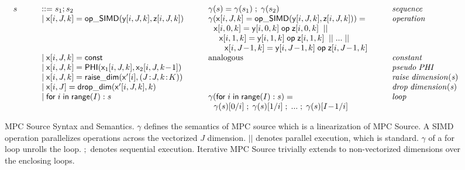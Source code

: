 \begin{figure*}%
\[
\begin{array}{l@{~~~~~}l}
  \begin{array}{l@{~~~~~~~~~}l@{~~~~~~~~~}l@{~~~~~~~~~}l}
  s &::= s_1;s_2 & \gamma(s) = \gamma(s_1) \; ; \; \gamma(s_2) & \mathit{sequence} \\
     & \mid \x[i,J,k] = {\sf op\_SIMD}(\y[i,J,k], \z[i,J,k]) & \gamma(\x[i,J,k] = {\sf op\_SIMD}(\y[i,J,k], \z[i,J,k])) = & \mathit{operation} \\ 
     &                                                                               & ~~\x[i,0,k] = \y[i,0,k] \; {\sf op} \; \z[i,0,k] \;\; || &  \\
     &                                                                               & ~~~~\x[i,1,k] = \y[i,1,k] \; {\sf op} \; \z[i,1,k] \;\; || \; ...\; || & \\
     &                                                                               & ~~~~~~\x[i,J\!-\!1,k] = \y[i,J\!-\!1,k] \; {\sf op} \; \z[i,J\!-\!1,k] & \\
     & \mid \x[i,J,k] = {\sf const} & \mbox{analogous} & \mathit{constant} \\
     & \mid \x[i,J,k]  = {\sf PHI}(\x_1[i,J,k],\x_2[i,J,k\!-\!1]) & & \mathit{pseudo} \; \mathit{PHI} \\
     & \mid \x[i,J,k] = {\sf raise\_dim}(\x'[i],(J\!:\!J,k\!:\!K)) & & \mathit{raise} \; \mathit{dimension(s)} \\
     & \mid \x[i,J] = {\sf drop\_dim}(\x'[i,J,k],k) &  & \mathit{drop} \; \mathit{dimension(s)} \\
     & \mid {\sf for} \; i \; {\sf in} \; {\sf range}(I): s  & \gamma({\sf for} \; i \; {\sf in} \; {\sf range}(I): s) = & \mathit{loop} \\
     & & ~~\gamma(s)[0/i] \; ; \; \gamma(s)[1/i] \; ; \; ... \; ; \; \gamma(s)[I\!-\!1/i] & \\
  \end{array}    \\
\end{array}
\]
\vspace{-3mm}
\caption{MPC Source Syntax and Semantics. $\gamma$ defines the semantics of MPC source which is a linearization of MPC Source. A SIMD operation parallelizes operations across the vectorized $J$ dimension. $||$ denotes parallel execution, which is standard. $\gamma$ of a for loop unrolls the loop. $;$ denotes sequential execution. Iterative MPC Source trivially extends to non-vectorized dimensions over the enclosing loops.}\label{fig:MPC_Source_syntax}
\label{fig:mpc_syntax}
\vspace{-5mm}
\end{figure*}

